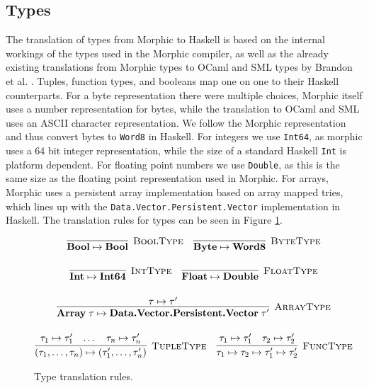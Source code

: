 \documentclass[a4paper,UKenglish,cleveref, autoref, thm-restate]{template/lipics-v2021}
\newcommand{\sml}{SML\xspace}
\begin{document}
\subsection{Types}
The translation of types from Morphic to Haskell is based on the internal workings of the types used in the Morphic compiler, as well as the already existing translations from Morphic types to OCaml and \sml types by Brandon et al. \cite{brandon2023better}. Tuples, function types, and booleans map one on one to their Haskell counterparts. For a byte representation there were multiple choices, Morphic itself uses a number representation for bytes, while the translation to OCaml and \sml uses an ASCII character representation. We follow the Morphic representation and thus convert bytes to \verb|Word8| in Haskell. For integers we use \verb|Int64|, as morphic uses a 64 bit integer representation, while the size of a standard Haskell \verb|Int| is platform dependent. For floating point numbers we use \verb|Double|, as this is the same size as the floating point representation used in Morphic. For arrays, Morphic uses a persistent array implementation based on array mapped tries, which lines up with the \verb|Data.Vector.Persistent.Vector| \cite{Ravitch} implementation in Haskell. The translation rules for types can be seen in Figure \ref{fig:type-rules}.
\begin{figure}
  \centering
  \begin{gather*}
    \infer[\textsc{BoolType}]%
    {\textbf{Bool} \mapsto \textbf{Bool}}%
    {} \quad
    \infer[\textsc{ByteType}]%
    {\textbf{Byte} \mapsto \textbf{Word8}}%
    {} \\[1em]
    \infer[\textsc{IntType}]%
    {\textbf{Int} \mapsto \textbf{Int64}}%
    {} \quad
    \infer[\textsc{FloatType}]%
    {\textbf{Float} \mapsto \textbf{Double}}%
    {} \\[1em]
    \infer[\textsc{ArrayType}]%
    {\textbf{Array} \; \tau \mapsto \textbf{Data.Vector.Persistent.Vector} \; \tau'}%
    {\tau \mapsto \tau'} \\[1em]
    \infer[\textsc{TupleType}]%
    {(\tau_1,\dots,\tau_n) \mapsto (\tau_1',\dots,\tau_n')}%
    {\tau_1 \mapsto \tau_1' & \dots & \tau_n \mapsto \tau_n'} \quad
    \infer[\textsc{FuncType}]%
    {\tau_1 \mapsto \tau_2 \mapsto \tau_1' \mapsto \tau_2'}%
    {\tau_1 \mapsto \tau_1' & \tau_2 \mapsto \tau_2'}
  \end{gather*}
  \caption{Type translation rules.}
  \label{fig:type-rules}
\end{figure}
\end{document}
